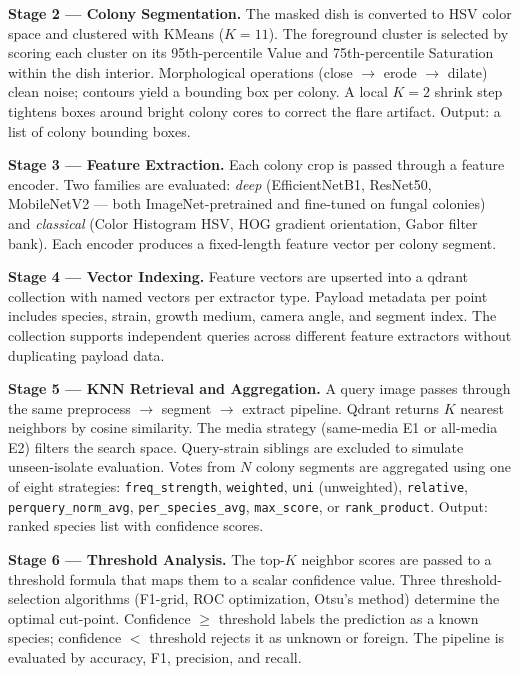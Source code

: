 \noindent\textbf{Stage 2 --- Colony Segmentation.} The masked dish is converted to HSV color space and clustered with KMeans ($K=11$). The foreground cluster is selected by scoring each cluster on its 95th-percentile Value and 75th-percentile Saturation within the dish interior. Morphological operations (close $\rightarrow$ erode $\rightarrow$ dilate) clean noise; contours yield a bounding box per colony. A local $K=2$ shrink step tightens boxes around bright colony cores to correct the flare artifact. Output: a list of colony bounding boxes.

\noindent\textbf{Stage 3 --- Feature Extraction.} Each colony crop is passed through a feature encoder. Two families are evaluated: \emph{deep} (EfficientNetB1, ResNet50, MobileNetV2 --- both ImageNet-pretrained and fine-tuned on fungal colonies) and \emph{classical} (Color Histogram HSV, HOG gradient orientation, Gabor filter bank). Each encoder produces a fixed-length feature vector per colony segment.

\noindent\textbf{Stage 4 --- Vector Indexing.} Feature vectors are upserted into a \gls{qdrant} collection with named vectors per extractor type. Payload metadata per point includes species, strain, growth medium, camera angle, and segment index. The collection supports independent queries across different feature extractors without duplicating payload data.

\noindent\textbf{Stage 5 --- KNN Retrieval and Aggregation.} A query image passes through the same preprocess $\rightarrow$ segment $\rightarrow$ extract pipeline. Qdrant returns $K$ nearest neighbors by cosine similarity. The media strategy (same-media E1 or all-media E2) filters the search space. Query-strain siblings are excluded to simulate unseen-isolate evaluation. Votes from $N$ colony segments are aggregated using one of eight strategies: \texttt{freq\_strength}, \texttt{weighted}, \texttt{uni} (unweighted), \texttt{relative}, \texttt{perquery\_norm\_avg}, \texttt{per\_species\_avg}, \texttt{max\_score}, or \texttt{rank\_product}. Output: ranked species list with confidence scores.

\noindent\textbf{Stage 6 --- Threshold Analysis.} The top-$K$ neighbor scores are passed to a threshold formula that maps them to a scalar confidence value. Three threshold-selection algorithms (F1-grid, ROC optimization, Otsu's method) determine the optimal cut-point. Confidence $\geq$ threshold labels the prediction as a known species; confidence $<$ threshold rejects it as unknown or foreign. The pipeline is evaluated by accuracy, F1, precision, and recall.


